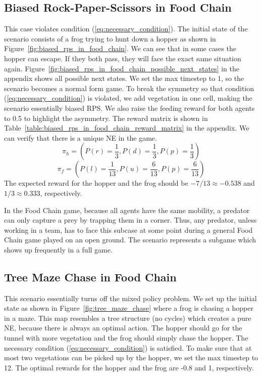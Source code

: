 \documentclass[]{interact}
\theoremstyle{plain}%
\theoremstyle{definition}
\theoremstyle{remark}
\begin{document}
\subsection{Biased Rock-Paper-Scissors in Food Chain}
This case violates condition (\ref{eq:necessary_condition}). The initial state of the scenario consists of a frog trying to hunt down a hopper as shown in Figure~\ref{fig:biased_rps_in_food_chain}. We can see that in some cases the hopper can escape. If they both pass, they will face the exact same situation again. Figure~\ref{fig:biased_rps_in_food_chain_possible_next_states} in the appendix shows all possible next states. We set the max timestep to 1, so the scenario becomes a normal form game. To break the symmetry so that condition (\ref{eq:necessary_condition}) is violated, we add vegetation in one cell, making the scenario essentially biased RPS. We also raise the feeding reward for both agents to 0.5 to highlight the asymmetry. The reward matrix is shown in Table~\ref{table:biased_rps_in_food_chain_reward_matrix} in the appendix. We can verify that there is a unique NE in the game.
\begin{equation}
    \pi_h=(P(r)=\frac{1}{3},P(d)=\frac{1}{3},P(p)=\frac{1}{3})
    \label{eq:biased_rps_in_food_chain_hopper_policy}
\end{equation}
\begin{equation}
    \pi_f=(P(l)=\frac{1}{13},P(u)=\frac{6}{13},P(p)=\frac{6}{13})
    \label{eq:biased_rps_in_food_chain_frog_policy}
\end{equation}
The expected reward for the hopper and the frog should be $-7/13 \approx -0.538$ and $1/3 \approx 0.333$, respectively.

In the Food Chain game, because all agents have the same mobility, a predator can only capture a prey by trapping them in a corner. Thus, any predator, unless working in a team, has to face this subcase at some point during a general Food Chain game played on an open ground. The scenario represents a subgame which shows up frequently in a full game.

\subsection{Tree Maze Chase in Food Chain}
This scenario essentially turns off the mixed policy problem. We set up the initial state as shown in Figure~\ref{fig:tree_maze_chase} where a frog is chasing a hopper in a maze. This map resembles a tree structure (no cycles) which creates a pure NE, because there is always an optimal action. The hopper should go for the tunnel with more vegetation and the frog should simply chase the hopper. The necessary condition (\ref{eq:necessary_condition}) is satisfied. To make sure that at most two vegetations can be picked up by the hopper, we set the max timestep to 12. The optimal rewards for the hopper and the frog are -0.8 and 1, respectively.
\end{document}
